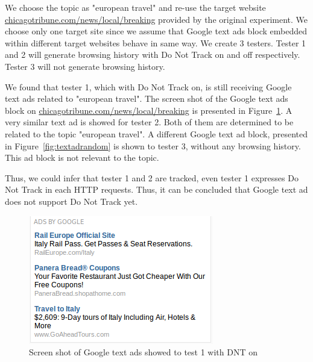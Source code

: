 \documentclass{sig-alternate}
\begin{document}
We choose the topic as "european travel" and re-use the target website \url{chicagotribune.com/news/local/breaking} provided by the original experiment. We choose only one target site since we assume that Google text ads block embedded within different target websites behave in same way. We create 3 testers. Tester 1 and 2 will generate browsing history with Do Not Track on and off respectively. Tester 3 will not generate browsing history.

We found that tester 1, which with Do Not Track on, is still receiving Google text ads related to "european travel". The screen shot of the Google text ads block on \url{chicagotribune.com/news/local/breaking} is presented in Figure~\ref{fig:textad}. A very similar text ad is showed for tester 2. Both of them are determined to be related to the topic "european travel". A different Google text ad block, presented in Figure~\ref{fig:textadrandom} is shown to tester 3, without any browsing history. This ad block is not relevant to the topic.

Thus, we could infer that tester 1 and 2 are tracked, even tester 1 expresses Do Not Track in each HTTP requests. Thus, it can be concluded that Google text ad does not support Do Not Track yet.
\begin{figure}
\begin{center}
\includegraphics[width=0.9\columnwidth]{textad}
\end{center}
\caption{Screen shot of Google text ads showed to test 1 with DNT on}
\label{fig:textad}
\end{figure}
\end{document}
